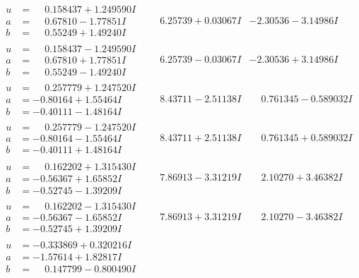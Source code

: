 \documentclass[1p]{elsarticle_modified}
\theoremstyle{definition}
\begin{document}
$$\begin{array}{c|c|c}
\begin{aligned}
u &= \phantom{-}0.158437 + 1.249590 I \\
a &= \phantom{-}0.67810 - 1.77851 I \\
b &= \phantom{-}0.55249 + 1.49240 I\end{aligned}
 & \phantom{-}6.25739 + 0.03067 I & -2.30536 - 3.14986 I \\ \hline\begin{aligned}
u &= \phantom{-}0.158437 - 1.249590 I \\
a &= \phantom{-}0.67810 + 1.77851 I \\
b &= \phantom{-}0.55249 - 1.49240 I\end{aligned}
 & \phantom{-}6.25739 - 0.03067 I & -2.30536 + 3.14986 I \\ \hline\begin{aligned}
u &= \phantom{-}0.257779 + 1.247520 I \\
a &= -0.80164 + 1.55464 I \\
b &= -0.40111 - 1.48164 I\end{aligned}
 & \phantom{-}8.43711 - 2.51138 I & \phantom{-}0.761345 - 0.589032 I \\ \hline\begin{aligned}
u &= \phantom{-}0.257779 - 1.247520 I \\
a &= -0.80164 - 1.55464 I \\
b &= -0.40111 + 1.48164 I\end{aligned}
 & \phantom{-}8.43711 + 2.51138 I & \phantom{-}0.761345 + 0.589032 I \\ \hline\begin{aligned}
u &= \phantom{-}0.162202 + 1.315430 I \\
a &= -0.56367 + 1.65852 I \\
b &= -0.52745 - 1.39209 I\end{aligned}
 & \phantom{-}7.86913 - 3.31219 I & \phantom{-}2.10270 + 3.46382 I \\ \hline\begin{aligned}
u &= \phantom{-}0.162202 - 1.315430 I \\
a &= -0.56367 - 1.65852 I \\
b &= -0.52745 + 1.39209 I\end{aligned}
 & \phantom{-}7.86913 + 3.31219 I & \phantom{-}2.10270 - 3.46382 I \\ \hline\begin{aligned}
u &= -0.333869 + 0.320216 I \\
a &= -1.57614 + 1.82817 I \\
b &= \phantom{-}0.147799 - 0.800490 I\end{aligned}

\end{array}$$
\end{document}
